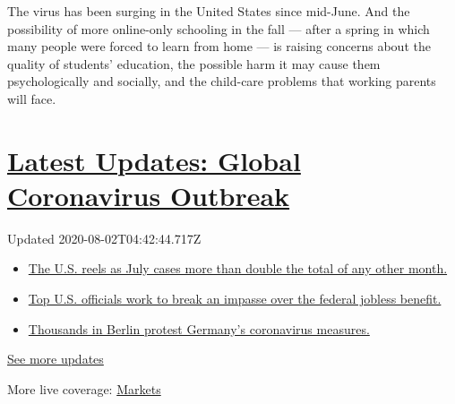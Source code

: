 The virus has been surging in the United States since mid-June. And the
possibility of more online-only schooling in the fall --- after a spring
in which many people were forced to learn from home --- is raising
concerns about the quality of students' education, the possible harm it
may cause them psychologically and socially, and the child-care problems
that working parents will face.

\hypertarget{latest-updates-global-coronavirus-outbreak}{%
\section{\texorpdfstring{\href{https://www.nytimes.com/2020/08/01/world/coronavirus-covid-19.html?action=click\&pgtype=Article\&state=default\&region=MAIN_CONTENT_1\&context=storylines_live_updates}{Latest
Updates: Global Coronavirus
Outbreak}}{Latest Updates: Global Coronavirus Outbreak}}\label{latest-updates-global-coronavirus-outbreak}}

Updated 2020-08-02T04:42:44.717Z

\begin{itemize}
\tightlist
\item
  \href{https://www.nytimes.com/2020/08/01/world/coronavirus-covid-19.html?action=click\&pgtype=Article\&state=default\&region=MAIN_CONTENT_1\&context=storylines_live_updates\#link-34047410}{The
  U.S. reels as July cases more than double the total of any other
  month.}
\item
  \href{https://www.nytimes.com/2020/08/01/world/coronavirus-covid-19.html?action=click\&pgtype=Article\&state=default\&region=MAIN_CONTENT_1\&context=storylines_live_updates\#link-780ec966}{Top
  U.S. officials work to break an impasse over the federal jobless
  benefit.}
\item
  \href{https://www.nytimes.com/2020/08/01/world/coronavirus-covid-19.html?action=click\&pgtype=Article\&state=default\&region=MAIN_CONTENT_1\&context=storylines_live_updates\#link-25930521}{Thousands
  in Berlin protest Germany's coronavirus measures.}
\end{itemize}

\href{https://www.nytimes.com/2020/08/01/world/coronavirus-covid-19.html?action=click\&pgtype=Article\&state=default\&region=MAIN_CONTENT_1\&context=storylines_live_updates}{See
more updates}

More live coverage:
\href{https://www.nytimes.com/live/2020/07/31/business/stock-market-today-coronavirus?action=click\&pgtype=Article\&state=default\&region=MAIN_CONTENT_1\&context=storylines_live_updates}{Markets}

